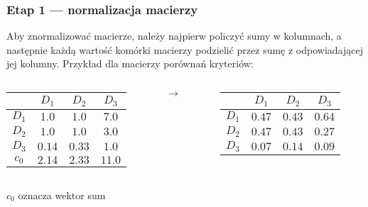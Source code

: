 \documentclass{beamer}
\begin{document}
\begin{frame}
\frametitle{Etap 1 --- normalizacja macierzy}
Aby znormalizować macierze, należy najpierw policzyć sumy w kolumnach, a następnie każdą wartość komórki macierzy podzielić przez sumę z odpowiadającej jej kolumny.
Przykład dla macierzy porównań kryteriów:
	\begin{columns}
		\begin{column}{0.4\textwidth}
			\begin{table}
				\begin{tabular}{c|c|c|c}
					&	$D_1$	&	$D_2$	&	$D_3$\\ \hline
				$D_1$	&	$1.0$	&	$1.0$	&	$7.0$\\ \hline
				$D_2$	&	$1.0$	&	$1.0$	&	$3.0$\\ \hline
				$D_3$	&	$0.14$	&	$0.33$	&	$1.0$\\ \hline\hline
				$c_0$	&	$2.14$	&	$2.33$	&	$11.0$
				\end{tabular}
			\end{table}
		\end{column}
		\begin{column}{0.1\textwidth}
			$\rightarrow$
		\end{column}
		\begin{column}{0.4\textwidth}
			\begin{table}
				\begin{tabular}{c|c|c|c}
					&	$D_1$	&	$D_2$	&	$D_3$\\ \hline
				$D_1$	&	$0.47$	&	$0.43$	&	$0.64$\\ \hline
				$D_2$	&	$0.47$	&	$0.43$	&	$0.27$\\ \hline
				$D_3$	&	$0.07$	&	$0.14$	&	$0.09$
				\end{tabular}
			\end{table}
		\end{column}
	\end{columns}
	$c_0$ oznacza wektor sum
\end{frame}
\end{document}
